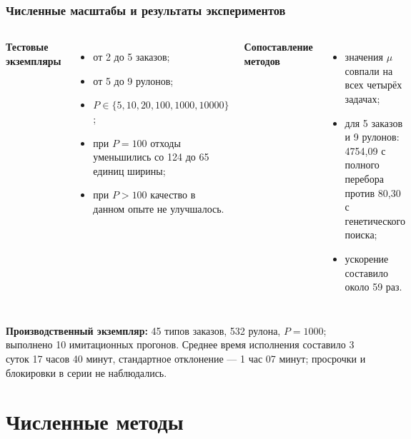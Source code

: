 \begin{frame}
    \frametitle{Численные масштабы и результаты экспериментов}
    
    \begin{columns}[T]
        \textbf{Тестовые экземпляры}
        \begin{itemize}
            \item от 2 до 5 заказов;
            \item от 5 до 9 рулонов;
            \item $P\in\{5,10,20,100,1000,10000\}$;
            \item при $P=100$ отходы уменьшились со 124 до 65 единиц ширины;
            \item при $P>100$ качество в данном опыте не улучшалось.
        \end{itemize}

        \textbf{Сопоставление методов}
        \begin{itemize}
            \item значения $\mu$ совпали на всех четырёх задачах;
            \item для 5 заказов и 9 рулонов: 4754,09 с полного перебора против 80,30 с генетического поиска;
            \item ускорение составило около 59 раз.
        \end{itemize}
    \end{columns}

    \vspace{0.2cm}
    \textbf{Производственный экземпляр:} 45 типов заказов, 532 рулона, $P=1000$; выполнено 10 имитационных прогонов. Среднее время исполнения составило 3 суток 17 часов 40 минут, стандартное отклонение — 1 час 07 минут; просрочки и блокировки в серии не наблюдались.
\end{frame}

\section{Численные методы}

